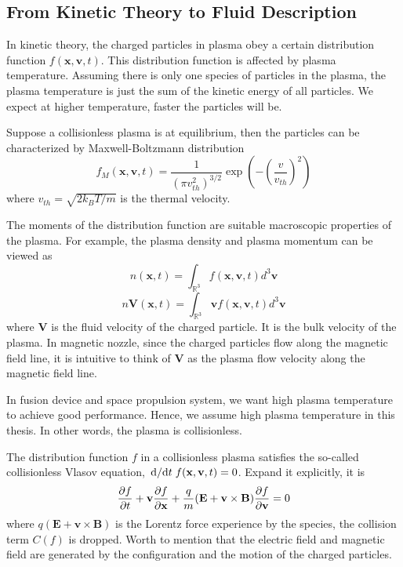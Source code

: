 \subsection{From Kinetic Theory to Fluid Description}
In kinetic theory, the charged particles in plasma obey a certain distribution function $f(\mathbf{x}, \mathbf{v}, t)$. This distribution function is affected by plasma temperature. Assuming there is only one species of particles in the plasma, the plasma temperature is just the sum of the kinetic energy of all particles. We expect at higher temperature, faster the particles will be.

Suppose a collisionless plasma is at equilibrium, then the particles can be characterized by Maxwell-Boltzmann distribution
\[ f_M(\mathbf{x}, \mathbf{v}, t) = \frac{1}{(\pi v_{th}^2)^{3/2}} \exp(-\left(\frac{v}{v_{th}}\right)^2) \]
where $v_{th} = \sqrt{2k_BT/m}$ is the thermal velocity.

The moments of the distribution function are suitable macroscopic properties of the plasma. For example, the plasma density and plasma momentum can be viewed as 
\[ n(\mathbf{x}, t) = \int_{\mathbb{R}^3} f(\mathbf{x}, \mathbf{v}, t) d^3\mathbf{v} \]
\[ n\mathbf{V}(\mathbf{x}, t) = \int_{\mathbb{R}^3} \mathbf{v}f(\mathbf{x}, \mathbf{v}, t) d^3\mathbf{v} \]
where $\mathbf{V}$ is the fluid velocity of the charged particle. It is the bulk velocity of the plasma. In magnetic nozzle, since the charged particles flow along the magnetic field line, it is intuitive to think of $\mathbf{V}$ as the plasma flow velocity along the magnetic field line.

In fusion device and space propulsion system, we want high plasma temperature to achieve good performance. Hence, we assume high plasma temperature in this thesis. In other words, the plasma is collisionless. 

The distribution function $f$ in a collisionless plasma satisfies the so-called collisionless Vlasov equation, $\dv*{t} f(\mathbf{x}, \mathbf{v}, t) = 0$. Expand it explicitly, it is
\begin{equation} \label{eq:vlasov}
	\pdv{f}{t} + \mathbf{v}\pdv{f}{\mathbf{x}} + \frac{q}{m}(\mathbf{E} + \mathbf{v}\times\mathbf{B})\pdv{f}{\mathbf{v}} = 0
\end{equation}
where $q(\mathbf{E} + \mathbf{v}\times\mathbf{B})$ is the Lorentz force experience by the species, the collision term $C(f)$ is dropped. Worth to mention that the electric field and magnetic field are generated by the configuration and the motion of the charged particles.

